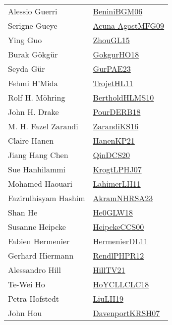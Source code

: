 {\begin{longtable}{p{4cm}p{20cm}}
Alessio Guerri & \href{papers/BeniniBGM06.pdf}{BeniniBGM06}\cite{BeniniBGM06} \\
Serigne Gueye & \href{papers/Acuna-AgostMFG09.pdf}{Acuna-AgostMFG09}\cite{Acuna-AgostMFG09} \\
Ying Guo & \href{papers/ZhouGL15.pdf}{ZhouGL15}\cite{ZhouGL15} \\
Burak G{\"{o}}kg{\"{u}}r & \href{}{GokgurHO18}\cite{GokgurHO18} \\
Seyda G{\"{u}}r & \href{articles/GurPAE23.pdf}{GurPAE23}\cite{GurPAE23} \\
Fehmi H'Mida & \href{articles/TrojetHL11.pdf}{TrojetHL11}\cite{TrojetHL11} \\
Rolf H. M{\"{o}}hring & \href{papers/BertholdHLMS10.pdf}{BertholdHLMS10}\cite{BertholdHLMS10} \\
John H. Drake & \href{articles/PourDERB18.pdf}{PourDERB18}\cite{PourDERB18} \\
M. H. Fazel Zarandi & \href{articles/ZarandiKS16.pdf}{ZarandiKS16}\cite{ZarandiKS16} \\
Claire Hanen & \href{papers/HanenKP21.pdf}{HanenKP21}\cite{HanenKP21} \\
Jiang Hang Chen & \href{articles/QinDCS20.pdf}{QinDCS20}\cite{QinDCS20} \\
Sue Hanhilammi & \href{papers/KrogtLPHJ07.pdf}{KrogtLPHJ07}\cite{KrogtLPHJ07} \\
Mohamed Haouari & \href{papers/LahimerLH11.pdf}{LahimerLH11}\cite{LahimerLH11} \\
Fazirulhisyam Hashim & \href{articles/AkramNHRSA23.pdf}{AkramNHRSA23}\cite{AkramNHRSA23} \\
Shan He & \href{papers/He0GLW18.pdf}{He0GLW18}\cite{He0GLW18} \\
Susanne Heipcke & \href{articles/HeipckeCCS00.pdf}{HeipckeCCS00}\cite{HeipckeCCS00} \\
Fabien Hermenier & \href{papers/HermenierDL11.pdf}{HermenierDL11}\cite{HermenierDL11} \\
Gerhard Hiermann & \href{papers/RendlPHPR12.pdf}{RendlPHPR12}\cite{RendlPHPR12} \\
Alessandro Hill & \href{papers/HillTV21.pdf}{HillTV21}\cite{HillTV21} \\
Te{-}Wei Ho & \href{papers/HoYCLLCLC18.pdf}{HoYCLLCLC18}\cite{HoYCLLCLC18} \\
Petra Hofstedt & \href{papers/LiuLH19.pdf}{LiuLH19}\cite{LiuLH19} \\
John Hou & \href{papers/DavenportKRSH07.pdf}{DavenportKRSH07}\cite{DavenportKRSH07} \\

\end{longtable}}
